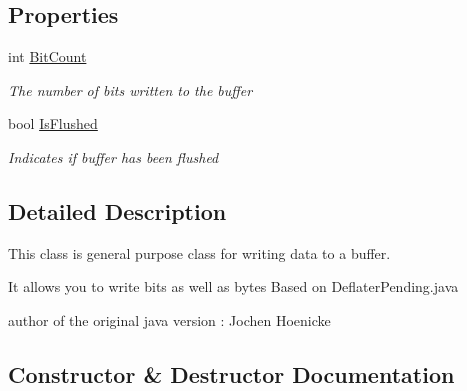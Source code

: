 \subsection*{Properties}
\begin{DoxyCompactItemize}
\item 
int \hyperlink{class_i_c_sharp_code_1_1_sharp_zip_lib_1_1_zip_1_1_compression_1_1_pending_buffer_a6983fb3d5ba10bd9f98ca19269456d5d}{Bit\+Count}
\begin{DoxyCompactList}\small\item\em The number of bits written to the buffer \end{DoxyCompactList}\item 
bool \hyperlink{class_i_c_sharp_code_1_1_sharp_zip_lib_1_1_zip_1_1_compression_1_1_pending_buffer_ad89d7e99140fb1b5178f9a1ab0562a26}{Is\+Flushed}
\begin{DoxyCompactList}\small\item\em Indicates if buffer has been flushed \end{DoxyCompactList}\end{DoxyCompactItemize}


\subsection{Detailed Description}
This class is general purpose class for writing data to a buffer. 

It allows you to write bits as well as bytes Based on Deflater\+Pending.\+java

author of the original java version \+: Jochen Hoenicke 

\subsection{Constructor \& Destructor Documentation}
\mbox{\label{class_i_c_sharp_code_1_1_sharp_zip_lib_1_1_zip_1_1_compression_1_1_pending_buffer_a1321c17e1246bfd949be6931cadef03d}} 
